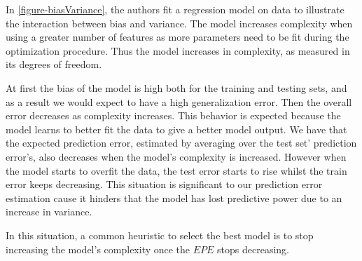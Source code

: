 In \ref{figure-biasVariance}, the authors fit a regression model on data to illustrate the interaction between bias and variance. The model increases complexity when using a greater number of features as more parameters need to be fit during the optimization procedure. Thus the model increases in complexity, as measured in its degrees of freedom. 

At first the bias of the model is high both for the training and testing sets, and as a result we would expect to have a high generalization error. Then the overall error decreases as complexity increases. This behavior is expected because the model learns to better fit the data to give a better model output. We have that the expected prediction error, estimated by averaging over the test set' prediction error's, also decreases when the model's complexity is increased. However when the model starts to overfit the data, the test error starts to rise whilst the train error keeps decreasing. This situation is significant to our prediction error estimation cause it hinders that the model has lost predictive power due to an increase in variance.

In this situation, a common heuristic to select the best model is to stop increasing the model's complexity once the $EPE$ stops decreasing.